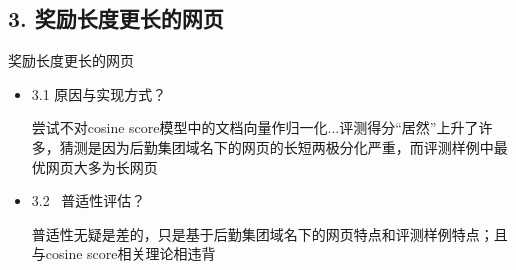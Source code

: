 \documentclass[12pt]{beamer}
\begin{document}
\subsection{3. 奖励长度更长的网页} %
\begin{frame}{奖励长度更长的网页}
\begin{itemize}
\item 3.1 原因与实现方式？

尝试不对cosine score模型中的文档向量作归一化...评测得分“居然”上升了许多，猜测是因为后勤集团域名下的网页的长短两极分化严重，而评测样例中最优网页大多为长网页
\item 3.2  普适性评估？

普适性无疑是差的，只是基于后勤集团域名下的网页特点和评测样例特点；且与cosine score相关理论相违背
\end{itemize}
\end{frame}
\end{document}
